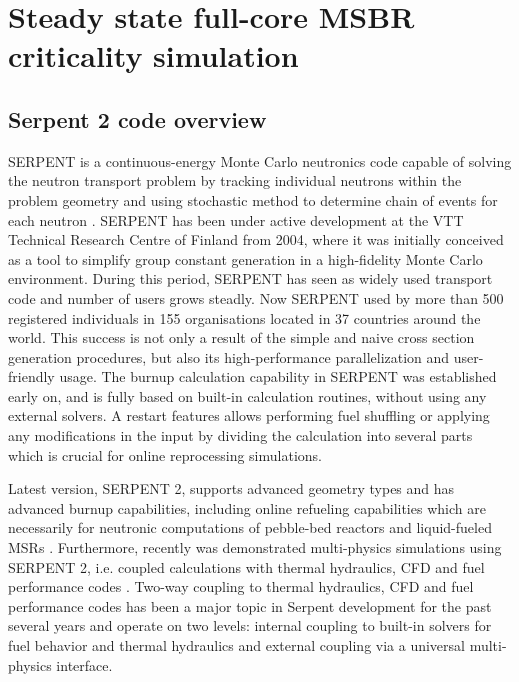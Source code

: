 \chapter[Steady state full-core MSBR criticality simulation]{Steady state full-core MSBR criticality simulation}

\section{Serpent 2 code overview}

SERPENT is a continuous-energy Monte Carlo neutronics code capable of solving the neutron transport problem by tracking individual neutrons within the problem geometry and using stochastic method to determine chain of events for each neutron \cite{leppanen_serpent_2015}. SERPENT has been under active development at the VTT Technical Research Centre of Finland from 2004, where it was initially conceived as a tool to simplify group constant generation in a high-fidelity Monte Carlo environment. During this period, SERPENT has seen as widely used transport code and number of users grows steadly. Now SERPENT used by more than 500 registered individuals in 155 organisations located in 37 countries around the world. This success is not only a result of the simple and naive cross section generation procedures, but also its high-performance parallelization and user-friendly usage. The burnup calculation capability in SERPENT was established early on, and is fully based on built-in calculation routines, without using any external solvers. A restart features allows performing fuel shuffling or applying any modifications in the input by dividing the calculation into several parts which is crucial for online reprocessing simulations.

Latest version, SERPENT 2, supports advanced geometry types and has advanced burnup capabilities, including online refueling capabilities which are necessarily for neutronic computations of pebble-bed reactors and liquid-fueled \glspl{MSR} \cite{aufiero_extended_2013}. Furthermore, recently was demonstrated multi-physics simulations using SERPENT 2, i.e. coupled calculations with thermal hydraulics, \gls{CFD} and fuel performance codes \cite{leppanen_numerical_2015}. Two-way coupling to thermal hydraulics, CFD and fuel performance codes has been a major topic in Serpent development for the past several years and operate on two levels: 	internal coupling to built-in solvers for fuel behavior and thermal hydraulics and external coupling via a universal multi-physics interface. 

